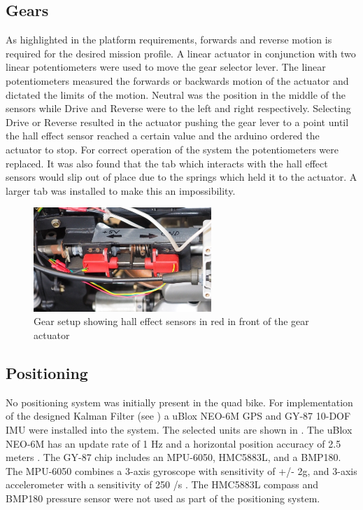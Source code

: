 \documentclass[main.tex]{subfiles}
\begin{document}
\subsection{Gears}
As highlighted in the platform requirements, forwards and reverse motion is required for the desired mission profile. A linear actuator in conjunction with two linear potentiometers were used to move the gear selector lever. The linear potentiometers measured the forwards or backwards motion of the actuator and dictated the limits of the motion. Neutral was the position in the middle of the sensors while Drive and Reverse were to the left and right respectively. Selecting Drive or Reverse resulted in the actuator pushing the gear lever to a point until the hall effect sensor reached a certain value and the arduino ordered the actuator to stop. For correct operation of the system the potentiometers were replaced. It was also found that the tab which interacts with the hall effect sensors would slip out of place due to the springs which held it to the actuator. A larger tab was installed to make this an impossibility.
\begin{figure}[ht]
\includegraphics[width=0.6\textwidth]{4-DetailedDesign/gearSetup.JPG}
\centering
\caption{Gear setup showing hall effect sensors in red in front of the gear actuator} 
\end{figure}
\subsection{Positioning}
No positioning system was initially present in the quad bike. For implementation of the designed Kalman Filter (see ) a uBlox NEO-6M GPS and GY-87 10-DOF IMU were installed into the system. The selected units are shown in . The uBlox NEO-6M has an update rate of 1 Hz and a horizontal position accuracy of 2.5 meters \parencite{ublox2011}. The GY-87 chip includes an MPU-6050, HMC5883L, and a BMP180. The MPU-6050 combines a 3-axis gyroscope with sensitivity of +/- 2g, and 3-axis accelerometer with a sensitivity of 250 \degree/s \parencite{invensense2013}. The HMC5883L compass and BMP180 pressure sensor were not used as part of the positioning system.
\end{document}
